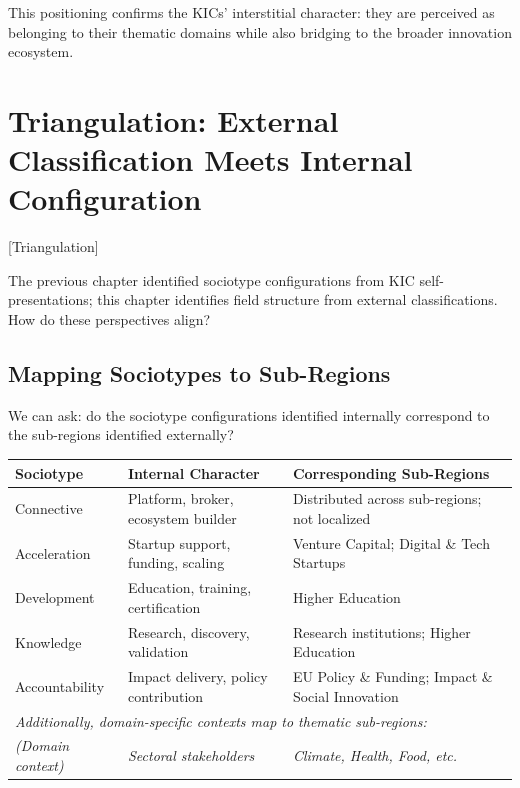 \documentclass[../main.tex]{subfiles}
\begin{document}
This positioning confirms the KICs' interstitial character: they are perceived as belonging to their thematic domains while also bridging to the broader innovation ecosystem.


\section{Triangulation: External Classification Meets Internal Configuration}[Triangulation]

The previous chapter identified sociotype configurations from KIC self-presentations; this chapter identifies field structure from external classifications. How do these perspectives align?

\subsection{Mapping Sociotypes to Sub-Regions}

We can ask: do the sociotype configurations identified internally correspond to the sub-regions identified externally?

\begin{center}
\small
\begin{tabular}{lp{4cm}p{4cm}}
\toprule
\textbf{Sociotype} & \textbf{Internal Character} & \textbf{Corresponding Sub-Regions} \\
\midrule
Connective & Platform, broker, ecosystem builder & Distributed across sub-regions; not localized \\
Acceleration & Startup support, funding, scaling & Venture Capital; Digital \& Tech Startups \\
Development & Education, training, certification & Higher Education \\
Knowledge & Research, discovery, validation & Research institutions; Higher Education \\
Accountability & Impact delivery, policy contribution & EU Policy \& Funding; Impact \& Social Innovation \\
\midrule
\multicolumn{3}{l}{\textit{Additionally, domain-specific contexts map to thematic sub-regions:}} \\
\textit{(Domain context)} & \textit{Sectoral stakeholders} & \textit{Climate, Health, Food, etc.} \\
\bottomrule
\end{tabular}
\end{center}
\end{document}
